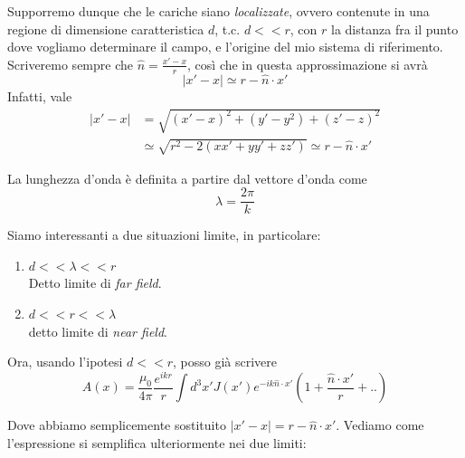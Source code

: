 \documentclass{report}
\begin{document}
    Supporremo dunque che le cariche siano \emph{localizzate}, ovvero contenute in una regione di dimensione caratteristica $d$, t.c. $d << r$, con $r$ la distanza fra il punto dove vogliamo determinare il campo, e l'origine del mio sistema di riferimento. Scriveremo sempre che $\hat{n} = \frac{x'-x}{r}$, così che in questa approssimazione si avrà 
    \begin{equation}
        |x'-x| \simeq r - \hat{n}\cdot x'
    \end{equation}
    Infatti, vale 
    \begin{align}
        |x'-x| &= \sqrt{(x'-x)^2 + (y'-y^2)+(z'-z)^2} \\ &\simeq \sqrt{r^2 - 2(xx' + yy' + zz')} \simeq  r - \hat{n}\cdot x'
    \end{align}

    La lunghezza d'onda è definita a partire dal vettore d'onda come
    \begin{equation}
        \lambda = \frac{2\pi}{k}
    \end{equation}

    Siamo interessanti a due situazioni limite, in particolare: 
    \begin{enumerate}
        \item $d << \lambda << r$ \\
        Detto limite di \emph{far field}. 
        \item $d << r << \lambda$ \\
        detto limite di \emph{near field}. 
    \end{enumerate}

    Ora, usando l'ipotesi $d << r$, posso già scrivere 
    \begin{equation}
        A(x) = \frac{\mu_0}{4\pi}\frac{e^{ikr}}{r}\int d^3x' J(x')e^{-ik \hat{n}\cdot x'}\left(1 + \frac{\hat{n}\cdot x'}{r}+ ..\right)
    \end{equation}

    Dove abbiamo semplicemente sostituito $|x'-x| = r - \hat{n}\cdot x'$. Vediamo come l'espressione si semplifica ulteriormente nei due limiti: 
\end{document}
